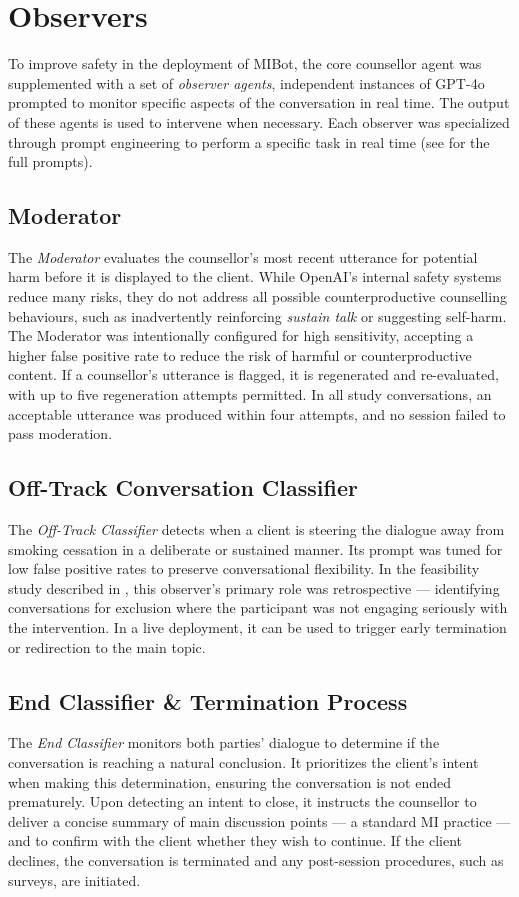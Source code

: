 \section{Observers}
\label{sec:observers}
To improve safety in the deployment of MIBot, the core counsellor agent was supplemented with a set of \textit{observer agents}, independent instances of GPT-4o prompted to monitor specific aspects of the conversation in real time. The output of these agents is used to intervene when necessary. Each observer was specialized through prompt engineering to perform a specific task in real time (see  for the full prompts).

\subsection{Moderator}
The \textit{Moderator} evaluates the counsellor's most recent utterance for potential harm before it is displayed to the client. While OpenAI's internal safety systems reduce many risks, they do not address all possible counterproductive counselling behaviours, such as inadvertently reinforcing \emph{sustain talk} or suggesting self-harm. The Moderator was intentionally configured for high sensitivity, accepting a higher false positive rate to reduce the risk of harmful or counterproductive content. If a counsellor's utterance is flagged, it is regenerated and re-evaluated, with up to five regeneration attempts permitted. In all study conversations, an acceptable utterance was produced within four attempts, and no session failed to pass moderation.

\subsection{Off-Track Conversation Classifier}
The \textit{Off-Track Classifier} detects when a client is steering the dialogue away from smoking cessation in a deliberate or sustained manner. Its prompt was tuned for low false positive rates to preserve conversational flexibility. In the feasibility study described in , this observer's primary role was retrospective --- identifying conversations for exclusion where the participant was not engaging seriously with the intervention. In a live deployment, it can be used to trigger early termination or redirection to the main topic.

\subsection{End Classifier \& Termination Process}
The \textit{End Classifier} monitors both parties' dialogue to determine if the conversation is reaching a natural conclusion. It prioritizes the client's intent when making this determination, ensuring the conversation is not ended prematurely. Upon detecting an intent to close, it instructs the counsellor to deliver a concise summary of main discussion points --- a standard MI practice --- and to confirm with the client whether they wish to continue. If the client declines, the conversation is terminated and any post-session procedures, such as surveys, are initiated.


